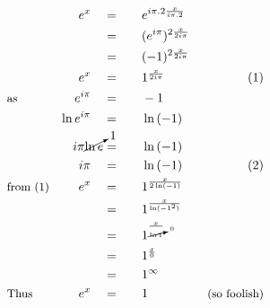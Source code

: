 \begin{alignat*}{5}
&\,&e^x\quad&=\quad&&e^{i\pi.2\frac{x}{i\pi.2}}\\
&\,&\,&=&&(e^{i\pi})^{2\frac{x}{2i\pi}}\\
&\,&\,&=&&(-1)^{2\frac{x}{2i\pi}}\\
&\,&e^x\quad&=&&1^\frac{x}{2i\pi}\quad&\small(1)\\
&\small\text{as}&e^{i\pi}\quad&=&&-1\\
&\,&\ln{e^{i\pi}}\quad&=&&\ln{(-1)}\\
&\,&i\pi\cancelto{1}{\ln{e}}&=&&\ln{(-1)}\\
&\,&i\pi\quad&=&&\ln{(-1)}\quad&\small(2)\\
&\small\text{from (1)}&e^x\quad&=&&1^\frac{x}{2\ln(-1)}\\
&\,&\,&=&&1^\frac{x}{\ln(-1^2)}\\
&\,&\,&=&&1^\frac{x}{\cancelto{0}{\ln{1}}}\\
&\,&\,&=&&1^\frac{x}{0}\\
&\,&\,&=&&1^\infty\\
&\small\text{Thus}&e^x\quad&=&&1\quad&\small\text{(so foolish)}
\end{alignat*}
